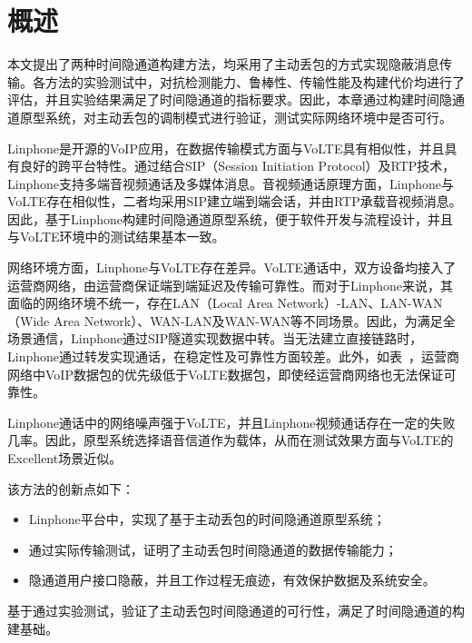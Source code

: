 \section{概述}
\label{chap:linphone:overview}

本文提出了两种时间隐通道构建方法，均采用了主动丢包的方式实现隐蔽消息传输。各方法的实验测试中，对抗检测能力、鲁棒性、传输性能及构建代价均进行了评估，并且实验结果满足了时间隐通道的指标要求。因此，本章通过构建时间隐通道原型系统，对主动丢包的调制模式进行验证，测试实际网络环境中是否可行。

Linphone是开源的VoIP应用，在数据传输模式方面与VoLTE具有相似性，并且具有良好的跨平台特性。通过结合SIP（Session Initiation Protocol）及RTP技术，Linphone支持多端音视频通话及多媒体消息。音视频通话原理方面，Linphone与VoLTE存在相似性，二者均采用SIP建立端到端会话，并由RTP承载音视频消息。因此，基于Linphone构建时间隐通道原型系统，便于软件开发与流程设计，并且与VoLTE环境中的测试结果基本一致。

网络环境方面，Linphone与VoLTE存在差异。VoLTE通话中，双方设备均接入了运营商网络，由运营商保证端到端延迟及传输可靠性。而对于Linphone来说，其面临的网络环境不统一，存在LAN（Local Area Network）-LAN、LAN-WAN（Wide Area Network）、WAN-LAN及WAN-WAN等不同场景。因此，为满足全场景通信，Linphone通过SIP隧道实现数据中转。当无法建立直接链路时，Linphone通过转发实现通话，在稳定性及可靠性方面较差。此外，如表\ ，运营商网络中VoIP数据包的优先级低于VoLTE数据包，即使经运营商网络也无法保证可靠性。

Linphone通话中的网络噪声强于VoLTE，并且Linphone视频通话存在一定的失败几率。因此，原型系统选择语音信道作为载体，从而在测试效果方面与VoLTE的Excellent场景近似。

该方法的创新点如下：
\begin{itemize}
	\item Linphone平台中，实现了基于主动丢包的时间隐通道原型系统；
	\item 通过实际传输测试，证明了主动丢包时间隐通道的数据传输能力；
	\item 隐通道用户接口隐蔽，并且工作过程无痕迹，有效保护数据及系统安全。
\end{itemize}

基于通过实验测试，验证了主动丢包时间隐通道的可行性，满足了时间隐通道的构建基础。